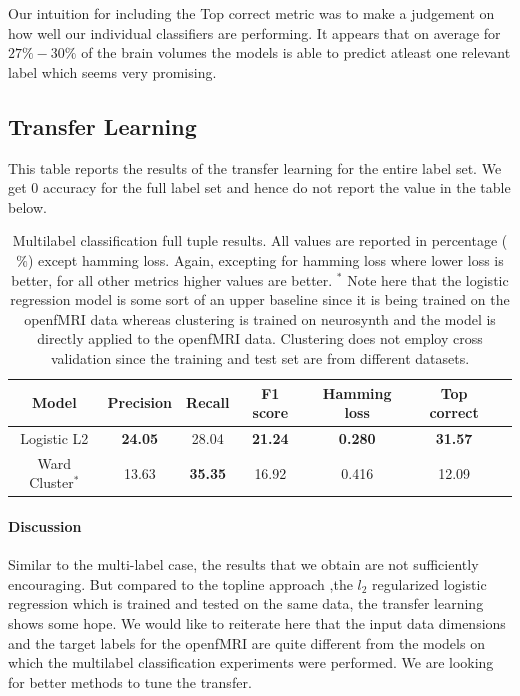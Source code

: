 \documentclass{article} %
\begin{document}
Our intuition for including the Top correct metric was to make a judgement on how well our individual classifiers are performing. It appears that on average for $27\%-30\%$ of the brain volumes the models is able to predict atleast one relevant label which seems very promising.


 \subsection{Transfer Learning}
This table reports the results of the transfer learning for the entire label set. We get 0 accuracy for the full label set and hence do not report the value in the table below.
\begin{table}[h]
\begin{center}
\begin{tabular}{|c|c|c|c|c|c|c|}
\hline
 Model           & Precision & Recall    & F1 score  & Hamming loss & Top correct\\ \hline
 Logistic L2     & \bf{24.05}& 28.04     & \bf{21.24}& \bf{0.280}   & \bf{31.57} \\ \hline
 Ward Cluster$^*$& 13.63     & \bf{35.35}& 16.92     & 0.416        & 12.09      \\ \hline
\end{tabular}
\caption{Multilabel classification full tuple results. All values are reported in percentage ($\%$) except hamming loss. Again, excepting for hamming loss where lower loss is better, for all other metrics higher values are better. $^*$ Note here that the logistic regression model is some sort of an upper baseline since it is being trained on the openfMRI data whereas clustering is trained on neurosynth and the model is directly applied to the openfMRI data. Clustering does not employ cross validation since the training and test set are from different datasets.}
\end{center}
\end{table}

\paragraph{Discussion}
Similar to the multi-label case, the results that we obtain are not sufficiently encouraging. But compared to the topline approach ,the $l_2$ regularized logistic regression which is trained and tested on the same data, the transfer learning shows some hope. We would like to reiterate here that the input data dimensions and the target labels for the openfMRI are quite different from the models on which the multilabel classification experiments were performed. We are looking for better methods to tune the transfer.
\end{document}
